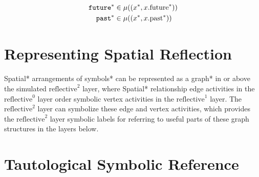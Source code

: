 \begin{align}
\text{\tt{future}}^* &\in \mu((x^*, x.\text{future}^*)) \\
  \text{\tt{past}}^* &\in \mu((x^*, x.\text{past}^*)) 
\end{align}



\section{Representing Spatial Reflection}

Spatial* arrangements of symbols* can be represented as a graph* in or
above the simulated $\text{reflective}^2$ layer, where Spatial*
relationship edge activities in the $\text{reflective}^0$ layer order
symbolic vertex activities in the $\text{reflective}^1$ layer.  The
$\text{reflective}^2$ layer can symbolize these edge and vertex
activities, which provides the $\text{reflective}^2$ layer symbolic
labels for referring to useful parts of these graph structures in the
layers below.

 \noindent





\section{Tautological Symbolic Reference}

